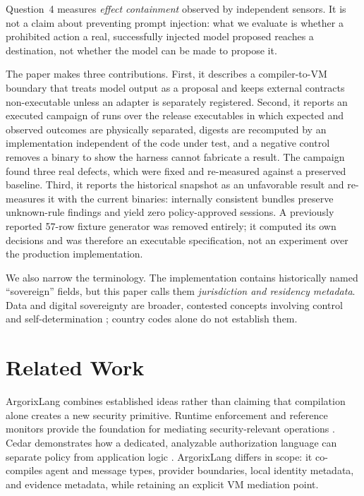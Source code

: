\documentclass[conference]{IEEEtran}
\begin{document}
Question~4 measures \emph{effect containment} observed by independent sensors.
It is not a claim about preventing prompt injection: what we evaluate is whether
a prohibited action a real, successfully injected model proposed reaches a
destination, not whether the model can be made to propose it.

The paper makes three contributions.  First, it describes a compiler-to-VM
boundary that treats model output as a proposal and keeps external contracts
non-executable unless an adapter is separately registered.  Second, it reports
an executed campaign of \campaignRows{} runs over the release executables in
which expected and observed outcomes are physically separated, digests are
recomputed by an implementation independent of the code under test, and a
negative control removes a binary to show the harness cannot fabricate a
result.  The campaign found three real defects, which were fixed and
re-measured against a preserved baseline.  Third, it reports the historical snapshot as an unfavorable result and
re-measures it with the current binaries: \snapshotVerified{} internally
consistent bundles preserve \snapshotUnknownTotal{} unknown-rule findings and
yield zero policy-approved sessions.  A previously reported 57-row fixture
generator was removed entirely; it computed its own decisions and was therefore
an executable specification, not an experiment over the production
implementation.

We also narrow the terminology.  The implementation contains historically
named ``sovereign'' fields, but this paper calls them \emph{jurisdiction and
residency metadata}.  Data and digital sovereignty are broader, contested
concepts involving control and self-determination \cite{pohle2020,vonscherenberg2024};
country codes alone do not establish them.

\section{Related Work}

ArgorixLang combines established ideas rather than claiming that compilation
alone creates a new security primitive.  Runtime enforcement and reference
monitors provide the foundation for mediating security-relevant operations
\cite{schneider2000,ligatti2010}.  Cedar demonstrates how a dedicated,
analyzable authorization language can separate policy from application logic
\cite{cutler2024cedar}.  ArgorixLang differs in scope: it co-compiles agent and
message types, provider boundaries, local identity metadata, and evidence
metadata, while retaining an explicit VM mediation point.
\end{document}
